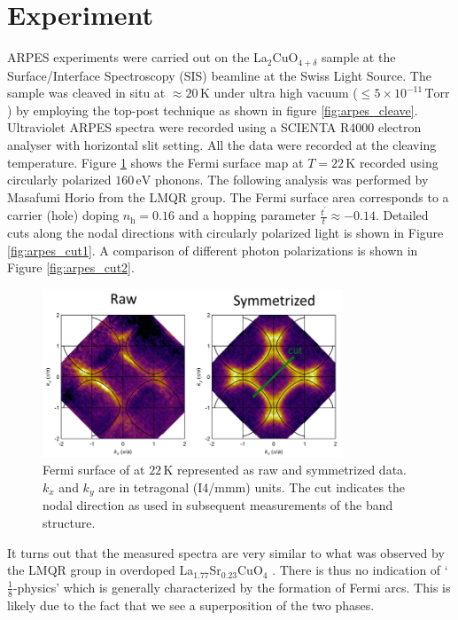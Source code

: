 \section{Experiment}
ARPES experiments were carried out on the La$_2$CuO$_{4+\delta}$ sample at the Surface/Interface Spectroscopy (SIS) beamline at the Swiss Light Source. The sample was cleaved in situ at $\approx 20\,\text{K}$ under ultra high vacuum ($\leq 5 \times 10^{-11}\,\text{Torr}$) by employing the top-post technique as shown in figure \ref{fig:arpes_cleave}. Ultraviolet ARPES spectra were recorded using a SCIENTA R4000 electron analyser with horizontal slit setting. All the data were recorded at the cleaving temperature. Figure \ref{fig:arpes_fs} shows the Fermi surface map at $T=22\,\text{K}$ recorded using circularly polarized $160\,\text{eV}$ phonons. The following analysis was performed by Masafumi Horio from the LMQR group. The Fermi surface area corresponds to a carrier (hole) doping $n_\text{h} = 0.16$ and a hopping parameter $\frac{t^\prime}{t} \approx -0.14$. Detailed cuts along the nodal directions with circularly polarized light is shown in Figure \ref{fig:arpes_cut1}. A comparison of different photon polarizations is shown in Figure \ref{fig:arpes_cut2}.

\begin{figure}
    \centering
    \includegraphics[width=0.8\textwidth]{fig/arpes/fermi_surface.png}
    \caption{Fermi surface of at $22\,\text{K}$ represented as raw and symmetrized data. $k_x$ and $k_y$ are in tetragonal (I4/mmm) units. The cut indicates the nodal direction as used in subsequent measurements of the band structure.}
    \label{fig:arpes_fs}
\end{figure}

It turns out that the measured spectra are very similar to what was observed by the LMQR group in overdoped La$_{1.77}$Sr$_{0.23}$CuO$_4$ \cite{Horio2018}. There is thus no indication of `$\frac{1}{8}$-physics' which is generally characterized by the formation of Fermi arcs. This is likely due to the fact that we see a superposition of the two phases.

